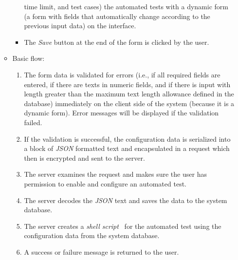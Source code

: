 \begin{enumerate}
\begin{itemize}
\begin{itemize}
                time limit, and
                test cases) the automated tests with a dynamic form (a form
                with fields that automatically change according to the previous
                input data) on the
                interface.
            \item The \emph{Save} button at the end of the form is clicked by
                the user.
        \end{itemize}
    \item Basic flow:
        \begin{enumerate}
            \item The form data is validated for errors
                (i.e., if all required fields are entered, if there are texts
                in numeric fields, and if there is input with length greater
                than the maximum text length allowance defined in the database)
                immediately on the client side of the system (because it is a
                dynamic form). Error messages
                will be displayed if the validation failed.
            \item If the validation is successful, the configuration data is
                serialized into a block of \emph{JSON} \cite{JSON} formatted text and
                encapsulated in a request which then is encrypted and sent to
                the server.
            \item The server examines the request and makes sure the user has
                permission to enable and configure an automated test.
            \item The server decodes the \emph{JSON} text and saves the data to
                the system database.
            \item The server creates a \emph{shell script}~\cite{shellScript}
                for the automated test using the configuration data from the
                system database.
            \item A success or failure message is returned to the user.
        \end{enumerate}
\end{itemize}


\end{enumerate}
